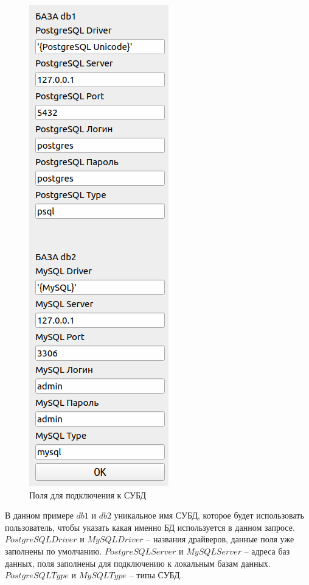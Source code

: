 \begin{figure}[h!]
	\begin{center}
		\includegraphics[scale=0.75]{./inc/img/interf_con}
		\caption{Поля для подключения к СУБД}
		\label{img:interf_con}
	\end{center}
\end{figure}

В данном примере $db1$ и $db2$ уникальное имя СУБД, которое будет использовать пользователь, чтобы указать какая именно БД используется в данном запросе. $PostgreSQL Driver$ и $MySQL Driver$ -- названия драйверов, данные поля уже заполнены по умолчанию. $PostgreSQL Server$ и \newline $MySQL Server$ -- адреса баз данных, поля заполнены для подключению к локальным базам данных. $PostgreSQL Type$ и $MySQL Type$ -- типы СУБД.

